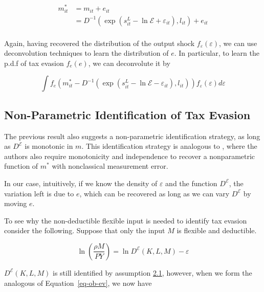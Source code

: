 \documentclass[
  12pt]{article}
\theoremstyle{definition}
\theoremstyle{remark}
\begin{document}
\[
\begin{aligned}
    m^*_{it}&=m_{it}+e_{it}\\
    &=D^{-1}(\exp(s^L_{it}-\ln\mathcal{E}+\varepsilon_{it}),l_{it})+e_{it}\\
\end{aligned}
\]

Again, having recovered the distribution of the output shock
\(f_{\varepsilon}(\varepsilon)\), we can use deconvolution techniques to
learn the distribution of \(e\). In particular, to learn the p.d.f of
tax evasion \(f_e(e)\), we can deconvolute it by

\[
    \int f_e(m^*_{it}-D^{-1}(\exp(s^L_{it}-\ln\mathcal{E}-\varepsilon_{it}),l_{it})) f_{\varepsilon}(\varepsilon)d\varepsilon
\]

\subsection{Non-Parametric Identification of Tax
Evasion}\label{non-parametric-identification-of-tax-evasion}

The previous result also suggests a non-parametric identification
strategy, as long as \(D^{\mathcal{E}}\) is monotonic in \(m\). This
identification strategy is analogous to \citet{Hu2022b}, where the
authors also require monotonicity and independence to recover a
nonparametric function of \(m^*\) with nonclassical measurement error.

In our case, intuitively, if we know the density of \(\varepsilon\) and
the function \(D^{\mathcal{E}}\), the variation left is due to \(e\),
which can be recovered as long as we can vary \(D^{\mathcal{E}}\) by
moving \(e\).

To see why the non-deductible flexible input is needed to identify tax
evasion consider the following. Suppose that only the input \(M\) is
flexible and deductible.

\[
\ln\left(\frac{\rho M}{PY}\right)=\ln D^{\mathcal{E}}(K,L,M)-\varepsilon
\]

\(D^{\mathcal{E}}(K,L,M)\) is still identified by assumption
\hyperref[ass-non-ev]{2.1}, however, when we form the analogous of
Equation~\ref{eq-ob-ev}, we now have
\end{document}

